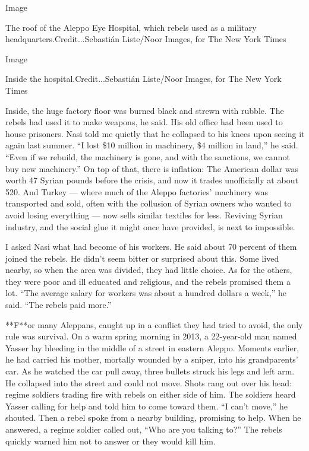 Image

The roof of the Aleppo Eye Hospital, which rebels used as a military
headquarters.Credit...Sebastián Liste/Noor Images, for The New York
Times

Image

Inside the hospital.Credit...Sebastián Liste/Noor Images, for The New
York Times

Inside, the huge factory floor was burned black and strewn with rubble.
The rebels had used it to make weapons, he said. His old office had been
used to house prisoners. Nasi told me quietly that he collapsed to his
knees upon seeing it again last summer. ``I lost \$10 million in
machinery, \$4 million in land,'' he said. ``Even if we rebuild, the
machinery is gone, and with the sanctions, we cannot buy new
machinery.'' On top of that, there is inflation: The American dollar was
worth 47 Syrian pounds before the crisis, and now it trades unofficially
at about 520. And Turkey --- where much of the Aleppo factories'
machinery was transported and sold, often with the collusion of Syrian
owners who wanted to avoid losing everything --- now sells similar
textiles for less. Reviving Syrian industry, and the social glue it
might once have provided, is next to impossible.

I asked Nasi what had become of his workers. He said about 70 percent of
them joined the rebels. He didn't seem bitter or surprised about this.
Some lived nearby, so when the area was divided, they had little choice.
As for the others, they were poor and ill educated and religious, and
the rebels promised them a lot. ``The average salary for workers was
about a hundred dollars a week,'' he said. ``The rebels paid more.''

**F**or many Aleppans, caught up in a conflict they had tried to avoid,
the only rule was survival. On a warm spring morning in 2013, a
22-year-old man named Yasser lay bleeding in the middle of a street in
eastern Aleppo. Moments earlier, he had carried his mother, mortally
wounded by a sniper, into his grandparents' car. As he watched the car
pull away, three bullets struck his legs and left arm. He collapsed into
the street and could not move. Shots rang out over his head: regime
soldiers trading fire with rebels on either side of him. The soldiers
heard Yasser calling for help and told him to come toward them. ``I
can't move,'' he shouted. Then a rebel spoke from a nearby building,
promising to help. When he answered, a regime soldier called out, ``Who
are you talking to?'' The rebels quickly warned him not to answer or
they would kill him.

